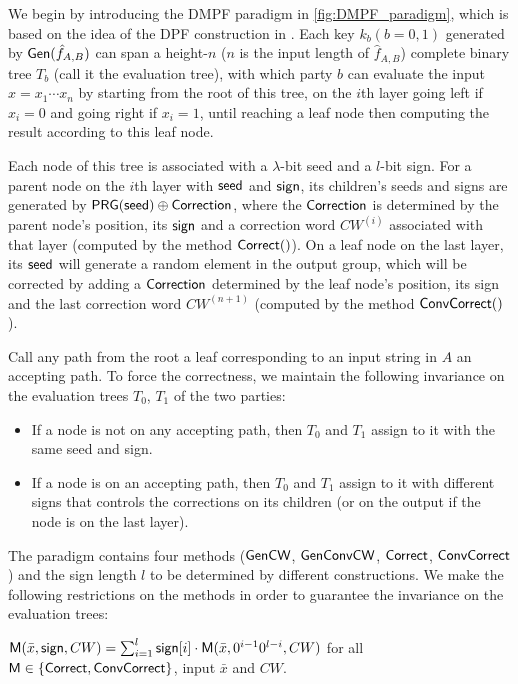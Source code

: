 \documentclass[sigconf]{acmart}
\newcommand{\seed}{{\sf seed}}
\newcommand{\sign}{{\sf sign}}
\begin{document}
We begin by introducing the DMPF paradigm in \cref{fig:DMPF_paradigm}, which is based on the idea of the DPF construction in \cite{CCS:BoyGilIsh16}. Each key $k_b(b=0,1)$ generated by ${\sf Gen}(\hat{f}_{A,B})$ can span a height-$n$ ($n$ is the input length of $\hat{f}_{A,B}$) complete binary tree $T_b$ (call it the evaluation tree), with which party $b$ can evaluate the input $x=x_1\cdots x_n$ by starting from the root of this tree, on the $i$th layer going left if $x_i=0$ and going right if $x_i=1$, until reaching a leaf node then computing the result according to this leaf node. 

Each node of this tree is associated with a $\lambda$-bit seed and a $l$-bit sign. For a parent node on the $i$th layer with $\seed$ and $\sign$, its children's seeds and signs are generated by $\sf PRG(\seed)\oplus Correction$, where the $\sf Correction$ is determined by the parent node's position, its $\sign$ and a correction word $CW^{(i)}$ associated with that layer (computed by the method $\sf Correct()$). On a leaf node on the last layer, its $\seed$ will generate a random element in the output group, which will be corrected by adding a $\sf Correction$ determined by the leaf node's position, its sign and the last correction word $CW^{(n+1)}$ (computed by the method $\sf ConvCorrect()$). 

Call any path from the root a leaf corresponding to an input string in $A$ an accepting path. To force the correctness, we maintain the following invariance on the evaluation trees $T_0$, $T_1$ of the two parties: 
\begin{itemize}
  \item If a node is not on any accepting path, then $T_0$ and $T_1$ assign to it with the same seed and sign. 
  \item If a node is on an accepting path, then $T_0$ and $T_1$ assign to it with different signs that controls the corrections on its children (or on the output if the node is on the last layer). 
\end{itemize}

The paradigm contains four methods ($\sf GenCW$, $\sf GenConvCW$, $\sf Correct$, $\sf ConvCorrect$) and the sign length $l$ to be determined by different constructions. We make the following restrictions on the methods in order to guarantee the invariance on the evaluation trees: 

${\sf M}(\bar{x},\sign, CW) =\sum_{i=1}^l\sign[i]\cdot{\sf M}(\bar{x},0^{i-1}0^{l-i},CW)$ for all $\sf M\in\{Correct, ConvCorrect\}$, input $\bar{x}$ and $CW$.
\end{document}
